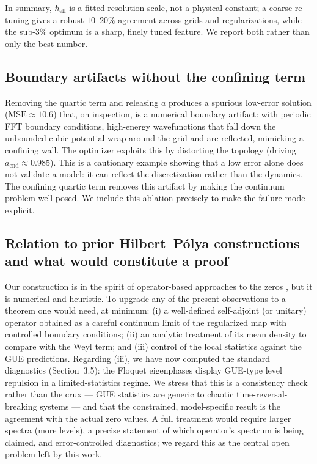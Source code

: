 \documentclass[utf8]{FrontiersinHarvard}
\begin{document}
In summary, $\hbar_{\mathrm{eff}}$ is a fitted resolution scale, not a physical constant; a coarse re-tuning gives a robust $10$--$20\%$ agreement across grids and regularizations, while the sub-$3\%$ optimum is a sharp, finely tuned feature. We report both rather than only the best number.

\subsection{Boundary artifacts without the confining term}

Removing the quartic term and releasing $a$ produces a spurious low-error solution ($\mathrm{MSE}\approx 10.6$) that, on inspection, is a numerical boundary artifact: with periodic FFT boundary conditions, high-energy wavefunctions that fall down the unbounded cubic potential wrap around the grid and are reflected, mimicking a confining wall. The optimizer exploits this by distorting the topology (driving $a_{\mathrm{end}}\approx 0.985$). This is a cautionary example showing that a low error alone does not validate a model: it can reflect the discretization rather than the dynamics. The confining quartic term removes this artifact by making the continuum problem well posed. We include this ablation precisely to make the failure mode explicit.

\subsection{Relation to prior Hilbert--P\'olya constructions and what would constitute a proof}

Our construction is in the spirit of operator-based approaches to the zeros \citep{berry1999,bender2017,connes1999,sierra2008,bishop2019}, but it is numerical and heuristic. To upgrade any of the present observations to a theorem one would need, at minimum: (i) a well-defined self-adjoint (or unitary) operator obtained as a careful continuum limit of the regularized map with controlled boundary conditions; (ii) an analytic treatment of its mean density to compare with the Weyl term; and (iii) control of the local statistics against the GUE predictions. Regarding (iii), we have now computed the standard diagnostics (Section~3.5): the Floquet eigenphases display GUE-type level repulsion in a limited-statistics regime. We stress that this is a consistency check rather than the crux --- GUE statistics are generic to chaotic time-reversal-breaking systems --- and that the constrained, model-specific result is the agreement with the actual zero values. A full treatment would require larger spectra (more levels), a precise statement of which operator's spectrum is being claimed, and error-controlled diagnostics; we regard this as the central open problem left by this work.
\end{document}
